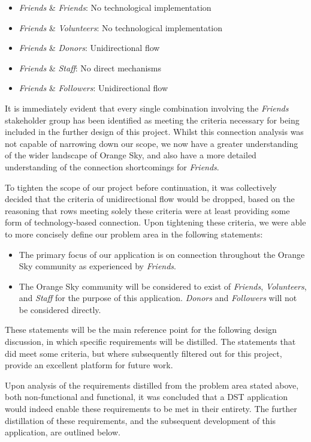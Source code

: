 \begin{itemize}
    \item \emph{Friends} \& \emph{Friends}: No technological implementation
    \item \emph{Friends} \& \emph{Volunteers}: No technological implementation
    \item \emph{Friends} \& \emph{Donors}: Unidirectional flow
    \item \emph{Friends} \& \emph{Staff}: No direct mechanisms
    \item \emph{Friends} \& \emph{Followers}: Unidirectional flow
\end{itemize}

It is immediately evident that every single combination involving the \emph{Friends} stakeholder group has been identified as meeting the criteria necessary for being included in the further design of this project. Whilst this connection analysis was not capable of narrowing down our scope, we now have a greater understanding of the wider landscape of Orange Sky, and also have a more detailed understanding of the connection shortcomings for \emph{Friends}.

To tighten the scope of our project before continuation, it was collectively decided that the criteria of unidirectional flow would be dropped, based on the reasoning that rows meeting solely these criteria were at least providing some form of technology-based connection. Upon tightening these criteria, we were able to more concisely define our problem area in the following statements:

\begin{itemize}
    \item The primary focus of our application is on connection throughout the Orange Sky community as experienced by \emph{Friends}.
    \item The Orange Sky community will be considered to exist of \emph{Friends}, \emph{Volunteers}, and \emph{Staff} for the purpose of this application. \emph{Donors} and \emph{Followers} will not be considered directly.
\end{itemize}

These statements will be the main reference point for the following design discussion, in which specific requirements will be distilled. The statements that did meet some criteria, but where subsequently filtered out for this project, provide an excellent platform for future work.

Upon analysis of the requirements distilled from the problem area stated above, both non-functional and functional, it was concluded that a DST application would indeed enable these requirements to be met in their entirety. The further distillation of these requirements, and the subsequent development of this application, are outlined below.

